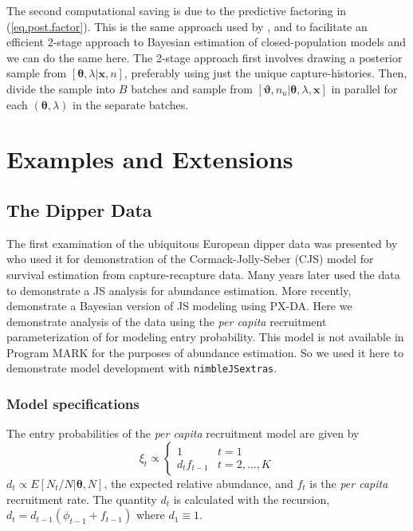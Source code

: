 \documentclass[12pt]{article}
\newcommand{\bx}{\ensuremath{\mathbf{x}}}
\newcommand{\bt}{\ensuremath{\boldsymbol{\theta}}}
\newcommand{\bvt}{\ensuremath{\boldsymbol{\vartheta}}}
\begin{document}
The second computational saving is due to the predictive factoring in (\ref{eq.post.factor}). This is the same approach used by \cite{Hooten:2023aa}, and \cite{hooten2024geostatistical} to facilitate an efficient 2-stage approach to Bayesian estimation of closed-population models and we can do the same here. The 2-stage approach first involves drawing a posterior sample from $[\bt,\lambda|\bx, n]$, preferably using just the unique capture-histories. Then, divide the sample into $B$ batches and sample from $[\bvt,n_u|\bt,\lambda,\bx]$ in parallel for each $(\bt,\lambda)$ in the separate batches. 


\section{Examples and Extensions}

\subsection{The Dipper Data}\label{sec:dipper}

The first examination of the ubiquitous European dipper data was presented by \cite{Cormack1964} who used it for demonstration of the Cormack-Jolly-Seber (CJS) model for survival estimation from capture-recapture data. Many years later \cite{Lebreton:1992gr} used the data to demonstrate a JS analysis for abundance estimation. More recently, \cite{Royle:2008kx} demonstrate a Bayesian version of JS modeling using PX-DA. Here we demonstrate analysis of the data using the {\it per capita} recruitment parameterization of \cite{link2005modeling} for modeling entry probability. This model is not available in Program MARK for the purposes of abundance estimation. So we used it here to demonstrate model development with \verb|nimbleJSextras|. 

\subsubsection{Model specifications}

The entry probabilities of the {\it per capita} recruitment model are given by 
\[
\xi_t \propto \left\{ \begin{array}{ll}
1  & t=1\\
d_t f_{t-1} & t=2,\dots,K
\end{array} \right.
\]
$d_t \propto E[N_t/N|\bt, N]$, the expected relative abundance, and $f_t$ is the {\it per capita} recruitment rate. The quantity $d_t$ is calculated with the recursion, $d_{t} = d_{t-1}(\phi_{t-1} + f_{t-1})$ where $d_1 \equiv 1$. 
\end{document}
